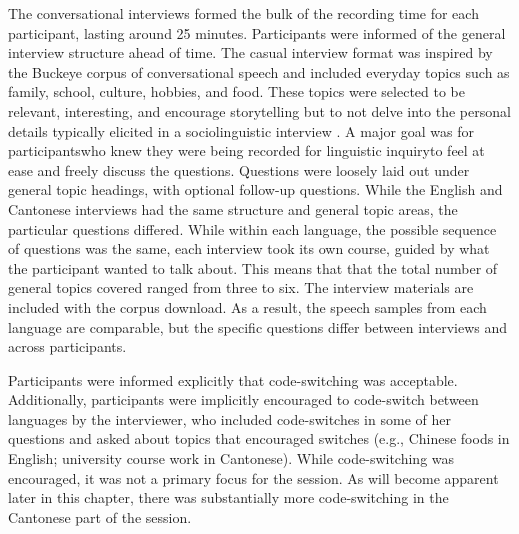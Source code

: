 The conversational interviews formed the bulk of the recording time for each participant, lasting around 25 minutes. Participants were informed of the general interview structure ahead of time. The casual interview format was inspired by the Buckeye corpus of conversational speech \citep{pitt_2005_buckeye} and included everyday topics such as family, school, culture, hobbies, and food. These topics were selected to be relevant, interesting, and encourage storytelling but to not delve into the personal details typically elicited in a sociolinguistic interview \citep{nagy_2011_hlvc}. A major goal was for participants\textemdash who knew they were being recorded for linguistic inquiry\textemdash to feel at ease and freely discuss the questions. Questions were loosely laid out under general topic headings, with optional follow-up questions. While the English and Cantonese interviews had the same structure and general topic areas, the particular questions differed. While within each language, the possible sequence of questions was the same, each interview took its own course, guided by what the participant wanted to talk about. This means that that the total number of general topics covered ranged from three to six. The interview materials are included with the corpus download. As a result, the speech samples from each language are comparable, but the specific questions differ between interviews and across participants. 

Participants were informed explicitly that code-switching was acceptable. Additionally, participants were implicitly encouraged to code-switch between languages by the interviewer, who included code-switches in some of her questions and asked about topics that encouraged switches (e.g., Chinese foods in English; university course work in Cantonese). While code-switching was encouraged, it was not a primary focus for the session. As will become apparent later in this chapter, there was substantially more code-switching in the Cantonese part of the session.

